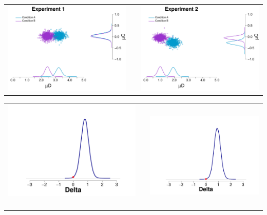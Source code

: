\documentclass[final]{beamer}
\newlength{\onecolwid}
\newlength{\twocolwid}
\begin{document}
\begin{frame}[t]
\begin{columns}[t]
\begin{column}{\twocolwid}
\begin{columns}[t,totalwidth=\twocolwid]
\begin{column}{\onecolwid}
\begin{alertblock}{}
\begin{enumerate}
\begin{center}
\begin{tabular}{ccc}
\includegraphics[width=0.45\linewidth]{Figures/Modelo_Delta_MeanDC_1.pdf} & \hfill & \includegraphics[width=0.45\linewidth]{Figures/Modelo_Delta_MeanDC_2.pdf}
\end{tabular}
\end{center}

\begin{center}
\begin{tabular}{ccc}
\includegraphics[width=0.35\linewidth]{Figures/Delta_1.pdf}  $\qquad$ $\qquad$ & \hfill & \includegraphics[width=0.35\linewidth]{Figures/Delta_2.pdf}
\end{tabular}
\end{center}



$\qquad$



\end{enumerate}
\end{alertblock}
\end{column}
\end{columns}
\end{column}
\end{columns}
\end{frame}
\end{document}
